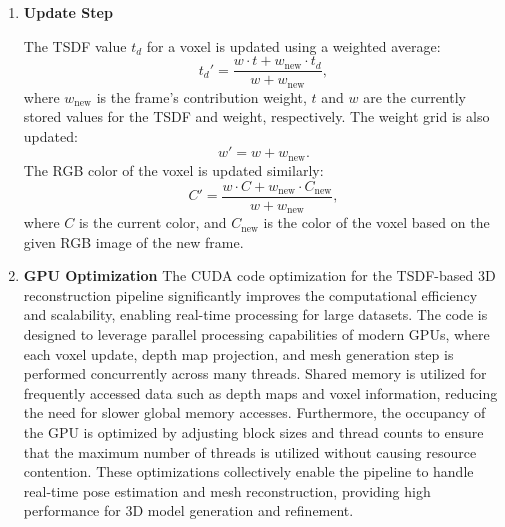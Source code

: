\documentclass[conference]{IEEEtran}
\begin{document}
\begin{enumerate}
    The signed distance $d$ between the voxel center and the surface is computed using the following formula:
    \begin{equation}
        d = D_{\text{pixel}} - D_{\text{voxel}},
    \end{equation}
    where $D_{\text{pixel}}$ represents the depth value of the projected pixel from the depth map, and $D_{\text{voxel}}$ is the distance of the voxel from the camera along the principal axis. The truncation step involves clipping the signed distance to the range of $[-t, t]$, where $t$ is the truncation margin. This is achieved by normalizing the distance obtained by $t$ and clipping it to the range $[-1, 1]$.
    \begin{equation}
        t_d = \max(-1, \min(1, d/t)).
    \end{equation}
    This truncation improves memory efficiency and focuses the reconstruction on the relevant scene information. After truncating the signed distance, the computed truncated distance value and the weight of the frame are used to update the TSDF.
    
    \item \textbf{Update Step} \par
    The TSDF value $t_d$ for a voxel is updated using a weighted average:
    \begin{equation}
        t_d' = \frac{w \cdot t + w_{\text{new}} \cdot t_d}{w + w_{\text{new}}},
    \end{equation}
    where $w_{\text{new}}$ is the frame's contribution weight, $t$ and $w$ are the currently stored values for the TSDF and weight, respectively. The weight grid is also updated:
    \begin{equation}
        w' = w + w_{\text{new}}.
    \end{equation}
    The RGB color of the voxel is updated similarly:
    \begin{equation}
        C' = \frac{w \cdot C + w_{\text{new}} \cdot C_{\text{new}}}{w + w_{\text{new}}},
    \end{equation}
    where $C$ is the current color, and $C_{\text{new}}$ is the color of the voxel based on the given RGB image of the new frame.

    \item \textbf{GPU Optimization}
    The CUDA code optimization for the TSDF-based 3D reconstruction pipeline significantly improves the computational efficiency and scalability, enabling real-time processing for large datasets. The code is designed to leverage parallel processing capabilities of modern GPUs, where each voxel update, depth map projection, and mesh generation step is performed concurrently across many threads. Shared memory is utilized for frequently accessed data such as depth maps and voxel information, reducing the need for slower global memory accesses. Furthermore, the occupancy of the GPU is optimized by adjusting block sizes and thread counts to ensure that the maximum number of threads is utilized without causing resource contention. These optimizations collectively enable the pipeline to handle real-time pose estimation and mesh reconstruction, providing high performance for 3D model generation and refinement.
    

\end{enumerate}
\end{document}
